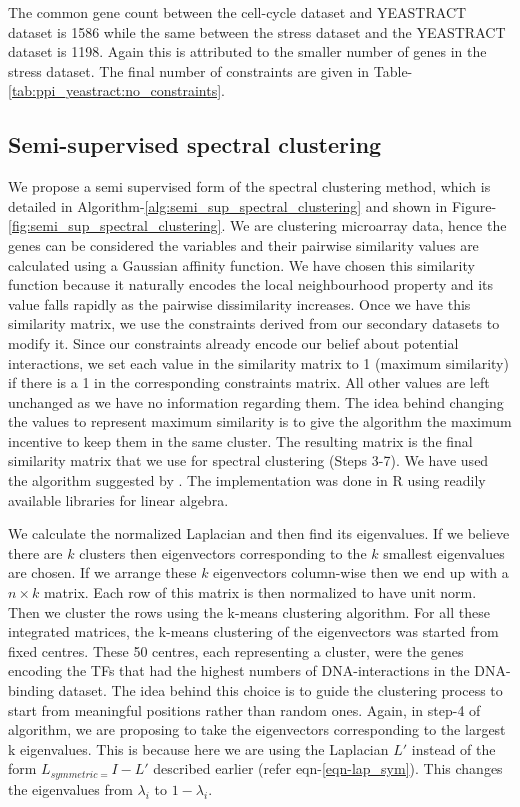 The common gene count between the cell-cycle dataset and YEASTRACT dataset is 1586 while the same between the stress dataset and the YEASTRACT dataset is 1198. Again this is attributed to the smaller number of genes in the stress dataset. The final number of constraints are given in Table-\ref{tab:ppi_yeastract:no_constraints}.

\subsection{Semi-supervised spectral clustering} \label{sec:sssc}
We propose a semi supervised form of the spectral clustering method, which is detailed in Algorithm-\ref{alg:semi_sup_spectral_clustering} and shown in Figure-\ref{fig:semi_sup_spectral_clustering}. We are clustering microarray data, hence the genes can be considered the variables and their pairwise similarity values are calculated using a Gaussian affinity function. We have chosen this similarity function because it naturally encodes the local neighbourhood property and its value falls rapidly as the pairwise dissimilarity increases. Once we have this similarity matrix, we use the constraints derived from our secondary datasets to modify it. Since our constraints already encode our belief about potential interactions, we set each value in the similarity matrix to 1 (maximum similarity) if there is a 1 in the corresponding constraints matrix. All other values are left unchanged as we have no information regarding them. The idea behind changing the values to represent maximum similarity is to give the algorithm the maximum incentive to keep them in the same cluster. The resulting matrix is the final similarity matrix that we use for spectral clustering (Steps 3-7). We have used the algorithm suggested by \citet{ng2001onspectral}. The implementation was done in R using readily available libraries for linear algebra. 

We calculate the normalized Laplacian and then find its eigenvalues. If we believe there are $k$ clusters then eigenvectors corresponding to the $k$ smallest eigenvalues are chosen. If we arrange these $k$ eigenvectors column-wise then we end up with a $n \times k$ matrix. Each row of this matrix is then normalized to have unit norm. Then we cluster the rows using the k-means clustering algorithm. For all these integrated matrices, the k-means clustering of the eigenvectors was started from fixed centres. These 50 centres, each representing a cluster, were the genes encoding the TFs that had the highest numbers of DNA-interactions in the DNA-binding dataset. The idea behind this choice is to guide the clustering process to start from meaningful positions rather than random ones. Again, in step-4 of algorithm, we are proposing to take the eigenvectors corresponding to the largest k eigenvalues. This is because here we are using the Laplacian $L'$ instead of the form $L_{symmetric=}I-L'$ described earlier (refer eqn-\ref{eqn-lap_sym}). This changes the eigenvalues from $\lambda_{i}$ to $1-\lambda_{i}$. 

